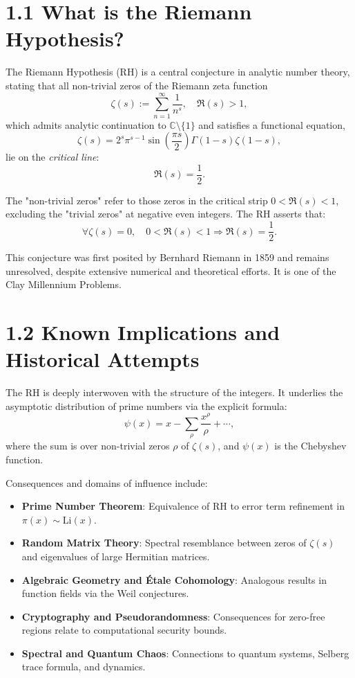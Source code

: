 \documentclass[11pt]{article}
\begin{document}
\section*{1.1 What is the Riemann Hypothesis?}

The Riemann Hypothesis (RH) is a central conjecture in analytic number theory, stating that all non-trivial zeros of the Riemann zeta function
\[
\zeta(s) := \sum_{n=1}^\infty \frac{1}{n^s}, \quad \Re(s) > 1,
\]
which admits analytic continuation to \( \mathbb{C} \setminus \{1\} \) and satisfies a functional equation,
\[
\zeta(s) = 2^s \pi^{s-1} \sin\left( \frac{\pi s}{2} \right) \Gamma(1-s) \zeta(1-s),
\]
lie on the \emph{critical line}:
\[
\Re(s) = \frac{1}{2}.
\]

The "non-trivial zeros" refer to those zeros in the critical strip \( 0 < \Re(s) < 1 \), excluding the "trivial zeros" at negative even integers. The RH asserts that:
\[
\forall \zeta(s) = 0, \quad 0 < \Re(s) < 1 \Rightarrow \Re(s) = \frac{1}{2}.
\]

This conjecture was first posited by Bernhard Riemann in 1859 and remains unresolved, despite extensive numerical and theoretical efforts. It is one of the Clay Millennium Problems.

\section*{1.2 Known Implications and Historical Attempts}

The RH is deeply interwoven with the structure of the integers. It underlies the asymptotic distribution of prime numbers via the explicit formula:
\[
\psi(x) = x - \sum_{\rho} \frac{x^\rho}{\rho} + \cdots,
\]
where the sum is over non-trivial zeros \( \rho \) of \( \zeta(s) \), and \( \psi(x) \) is the Chebyshev function.

Consequences and domains of influence include:

\begin{itemize}
  \item \textbf{Prime Number Theorem}: Equivalence of RH to error term refinement in \( \pi(x) \sim \mathrm{Li}(x) \).
  \item \textbf{Random Matrix Theory}: Spectral resemblance between zeros of \( \zeta(s) \) and eigenvalues of large Hermitian matrices.
  \item \textbf{Algebraic Geometry and Étale Cohomology}: Analogous results in function fields via the Weil conjectures.
  \item \textbf{Cryptography and Pseudorandomness}: Consequences for zero-free regions relate to computational security bounds.
  \item \textbf{Spectral and Quantum Chaos}: Connections to quantum systems, Selberg trace formula, and dynamics.
\end{itemize}
\end{document}
